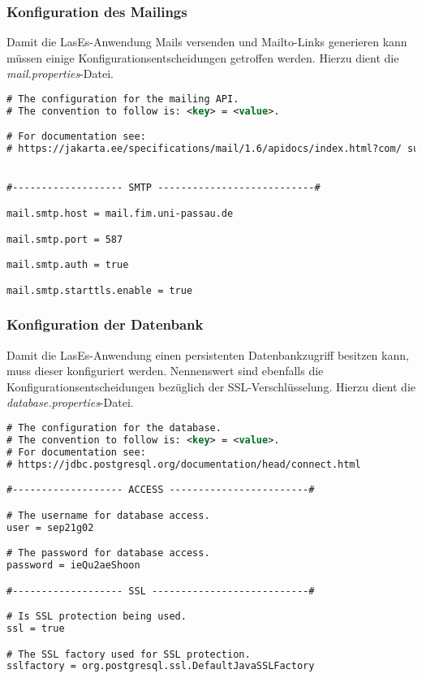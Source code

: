 \subsubsection{Konfiguration des Mailings}
Damit die LasEs-Anwendung Mails versenden und Mailto-Links generieren kann
müssen einige Konfigurationsentscheidungen getroffen werden.
Hierzu dient die \emph{mail.properties}-Datei.

\begin{lstlisting}[language=XML, caption = Die Mailingkonfiguration \emph{mail.properties},
    breaklines=true]
# The configuration for the mailing API.
# The convention to follow is: <key> = <value>.

# For documentation see:
# https://jakarta.ee/specifications/mail/1.6/apidocs/index.html?com/ sun/mail/smtp/package-summary.html


#------------------- SMTP ---------------------------#

mail.smtp.host = mail.fim.uni-passau.de

mail.smtp.port = 587

mail.smtp.auth = true

mail.smtp.starttls.enable = true
\end{lstlisting}

\subsubsection{Konfiguration der Datenbank}
Damit die LasEs-Anwendung einen persistenten Datenbankzugriff besitzen kann,
muss dieser konfiguriert werden. Nennenswert sind ebenfalls die
Konfigurationsentscheidungen bezüglich der SSL-Verschlüsselung.
Hierzu dient die \emph{database.properties}-Datei.

\begin{lstlisting}[language=XML, caption = Die Datenbankkonfiguration \emph{database.properties}]
# The configuration for the database.
# The convention to follow is: <key> = <value>.
# For documentation see:
# https://jdbc.postgresql.org/documentation/head/connect.html

#------------------- ACCESS ------------------------#

# The username for database access.
user = sep21g02

# The password for database access.
password = ieQu2aeShoon

#------------------- SSL ---------------------------#

# Is SSL protection being used.
ssl = true

# The SSL factory used for SSL protection.
sslfactory = org.postgresql.ssl.DefaultJavaSSLFactory
\end{lstlisting}


